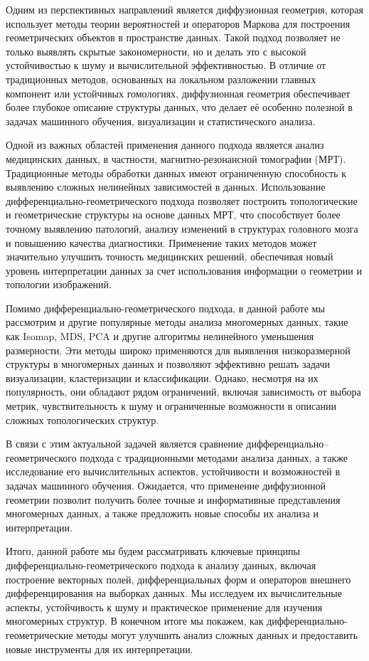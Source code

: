 \documentclass[a4paper,12pt]{extarticle}
\begin{document}
Одним из перспективных направлений является диффузионная геометрия, которая использует методы теории вероятностей и операторов Маркова для построения геометрических объектов в пространстве данных. Такой подход позволяет не только выявлять скрытые закономерности, но и делать это с высокой устойчивостью к шуму и вычислительной эффективностью. В отличие от традиционных методов, основанных на локальном разложении главных компонент или устойчивых гомологиях, диффузионная геометрия обеспечивает более глубокое описание структуры данных, что делает её особенно полезной в задачах машинного обучения, визуализации и статистического анализа.

Одной из важных областей применения данного подхода является анализ медицинских данных, в частности, магнитно-резонансной томографии (МРТ). Традиционные методы обработки данных имеют ограниченную способность к выявлению сложных нелинейных зависимостей в данных. Использование дифференциально-геометрического подхода позволяет построить топологические и геометрические структуры на основе данных МРТ, что способствует более точному выявлению патологий, анализу изменений в структурах головного мозга и повышению качества диагностики. Применение таких методов может значительно улучшить точность медицинских решений, обеспечивая новый уровень интерпретации данных за счет использования информации о геометрии и топологии изображений.

Помимо дифференциально-геометрического подхода, в данной работе мы рассмотрим и другие популярные методы анализа многомерных данных, такие как Isomap, MDS, PCA и другие алгоритмы нелинейного уменьшения размерности. Эти методы широко применяются для выявления низкоразмерной структуры в многомерных данных и позволяют эффективно решать задачи визуализации, кластеризации и классификации. Однако, несмотря на их популярность, они обладают рядом ограничений, включая зависимость от выбора метрик, чувствительность к шуму и ограниченные возможности в описании сложных топологических структур.

В связи с этим актуальной задачей является сравнение дифференциально–геометрического подхода с традиционными методами анализа данных, а также исследование его вычислительных аспектов, устойчивости и возможностей в задачах машинного обучения. Ожидается, что применение диффузионной геометрии позволит получить более точные и информативные представления многомерных данных, а также предложить новые способы их анализа и интерпретации.

Итого, данной работе мы будем рассматривать ключевые принципы дифференциально-геометрического подхода к анализу данных, включая построение векторных полей, дифференциальных форм и операторов внешнего дифференцирования на выборках данных. Мы исследуем их вычислительные аспекты, устойчивость к шуму и практическое применение для изучения многомерных структур. В конечном итоге мы покажем, как дифференциально-геометрические методы могут улучшить анализ сложных данных и предоставить новые инструменты для их интерпретации.
\end{document}
